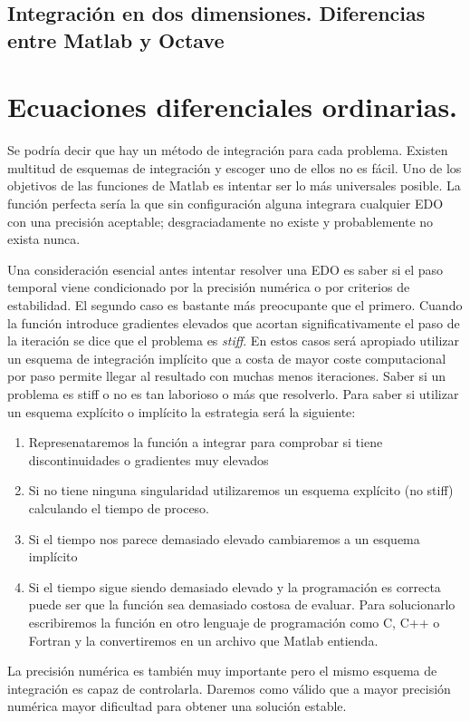 \subsection{Integración en dos dimensiones.  Diferencias entre Matlab
  y Octave}

\section{Ecuaciones diferenciales ordinarias.}

Se podría decir que hay un método de integración para cada problema.
Existen multitud de esquemas de integración y escoger uno de ellos
no es fácil. Uno de los objetivos de las funciones de Matlab es intentar
ser lo más universales posible. La función perfecta sería la que sin
configuración alguna integrara cualquier EDO con una precisión
aceptable; desgraciadamente no existe y probablemente no exista nunca.

Una consideración esencial antes intentar resolver una EDO es saber
si el paso temporal viene condicionado por la precisión numérica o
por criterios de estabilidad. El segundo caso es bastante más preocupante
que el primero. Cuando la función introduce gradientes elevados que
acortan significativamente el paso de la iteración se dice que el
problema es \emph{stiff}. En estos casos será apropiado
utilizar un esquema de integración implícito que a costa de mayor
coste computacional por paso permite llegar al resultado con muchas
menos iteraciones. Saber si un problema es stiff o no es tan laborioso
o más que resolverlo. Para saber si utilizar un esquema explícito
o implícito la estrategia será la siguiente:

\begin{enumerate}
\item Represenataremos la función a integrar para comprobar si tiene discontinuidades
o gradientes muy elevados
\item Si no tiene ninguna singularidad utilizaremos un esquema explícito
(no stiff) calculando el tiempo de proceso.
\item Si el tiempo nos parece demasiado elevado cambiaremos a un esquema
implícito
\item Si el tiempo sigue siendo demasiado elevado y la programación es correcta
puede ser que la función sea demasiado costosa de evaluar. Para solucionarlo
escribiremos la función en otro lenguaje de programación como C, C++
o Fortran y la convertiremos en un archivo que Matlab entienda.
\end{enumerate}
La precisión numérica es también muy importante pero el mismo esquema
de integración es capaz de controlarla. Daremos como válido que a
mayor precisión numérica mayor dificultad para obtener una solución
estable.

